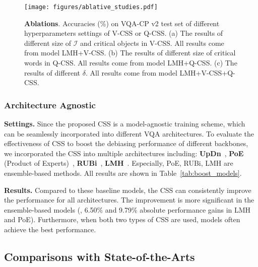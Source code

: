 \documentclass[10pt,twocolumn,letterpaper]{article}
\begin{document}
\begin{figure*}[htbp]
	\centering
	\texttt{[image: figures/ablative\_studies.pdf]}
	\vspace{-0.8em}
	\caption{\textbf{Ablations}. Accuracies (\%) on VQA-CP v2 test set of different hyperparameters settings of V-CSS or Q-CSS. (a) The results of different size of $\mathcal{I}$ and critical objects in V-CSS. All results come from model LMH+V-CSS. (b) The results of different size of critical words in Q-CSS. All results come from model LMH+Q-CSS. (c) The results of different $\delta$. All results come from model LMH+V-CSS+Q-CSS. }
	\label{fig:4}
\end{figure*}


\subsubsection{Architecture Agnostic}

\noindent\textbf{Settings.} Since the proposed CSS is a model-agnostic training scheme, which can be seamlessly incorporated into different VQA architectures. To evaluate the effectiveness of CSS to boost the debiasing performance of different backbones, we incorporated the  CSS into multiple architectures including: \textbf{UpDn}~\cite{anderson2018bottom}, \textbf{PoE} (Product of Experts)~\cite{clark2019don, mahabadi2019simple}, \textbf{RUBi}~\cite{cadene2019rubi}, \textbf{LMH}~\cite{clark2019don}. Especially, PoE, RUBi, LMH are ensemble-based methods. All results are shown in Table~\ref{tab:boost_models}.

\noindent\textbf{Results.} Compared to these baseline models, the CSS can consistently improve the performance for all architectures. The improvement is more significant in the ensemble-based models (\eg, 6.50\% and 9.79\% absolute performance gains in LMH and PoE). Furthermore, when both two types of CSS are used, models often achieve the best performance.


\subsection{Comparisons with State-of-the-Arts}
\end{document}
